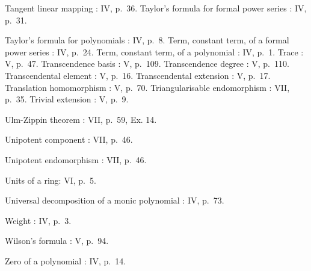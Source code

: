 Tangent linear mapping : IV, p.~36. Taylor's formula for formal power series : IV, p.~31.

Taylor's formula for polynomials : IV, p.~8. Term, constant term, of a formal power series : IV, p.~24. Term, constant term, of a polynomial : IV, p.~1. Trace : V, p.~47. Transcendence basis : V, p.~109. Transcendence degree : V, p.~110. Transcendental element : V, p.~16. Transcendental extension : V, p.~17. Translation homomorphism : V, p.~70. Triangularisable endomorphism : VII, p.~35. Trivial extension : V, p.~9.

Ulm-Zippin theorem : VII, p.~59, Ex. 14.

Unipotent component : VII, p.~46.

Unipotent endomorphism : VII, p.~46.

Units of a ring: VI, p.~5.

Universal decomposition of a monic polynomial : IV, p.~73.

Weight : IV, p.~3.

Wilson's formula : V, p.~94.

Zero of a polynomial : IV, p.~14.
